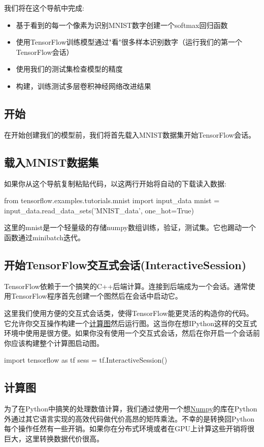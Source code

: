 我们将在这个导航中完成:
\begin{itemize}
\item 基于看到的每一个像素为识别MNIST数字创建一个softmax回归函数
\item 使用TensorFlow训练模型通过"看"很多样本识别数字（运行我们的第一个TensorFlow会话）
\item 使用我们的测试集检查模型的精度
\item 构建，训练测试多层卷积神经网络改进结果
\end{itemize}
\subsection{开始}
在开始创建我们的模型前，我们将首先载入MNIST数据集开始TensorFlow会话。
\subsection{载入MNIST数据集}
如果你从这个导航复制粘贴代码，以这两行开始将自动的下载读入数据:
\begin{pythoncode}
from tensorflow.examples.tutorials.mnist import input_data
mnist = input_data.read_data_sets('MNIST_data', one_hot=True)
\end{pythoncode}
这里的mnist是一个轻量级的存储numpy数组训练，验证，测试集。它也踢动一个函数通过minibatch迭代。
\subsection{开始TensorFlow交互式会话(InteractiveSession)}
TensorFlow依赖于一个搞笑的C++后端计算。连接到后端成为一个会话。通常使用TensorFlow程序首先创建一个图然后在会话中启动它。

这里我们使用方便的交互式会话类，使得TensorFlow能更灵活的构造你的代码。它允许你交互操作构建一个\href{https://www.tensorflow.org/get_started/get_started#the_computational_graph}{计算图}然后运行图。这当你在想IPython这样的交互式环境中使用是很方便。如果你没有使用一个交互式会话，然后在你开启一个会话前你应该构建整个计算图启动图。
\begin{pythoncode}
import tensorflow as tf
sess = tf.InteractiveSession()
\end{pythoncode}
\subsection{计算图}
为了在Python中搞笑的处理数值计算，我们通过使用一个想\href{http://www.numpy.org/}{Numpy}的库在Python外通过其它语言实现的高效代码做代价高昂的矩阵乘法。不幸的是转换回Python每个操作任然有一些开销。如果你在分布式环境或者在GPU上计算这些开销将很巨大，这里转换数据代价很高。


